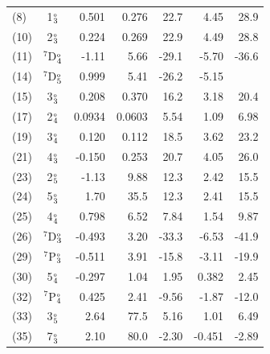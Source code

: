 \documentclass[10pt,a4paper, twoside, openright]{report}
\begin{document}
{\begin{longtable}{l@{\hspace{0.01cm}}c@{\hspace{0.5cm}}r@{\hspace{0.5cm}}r@{\hspace{0.5cm}}r@{\hspace{0.5cm}}r@{\hspace{0.5cm}}r}
(8)  & 1$_{3}^{\rm_o}$     & 0.501 &  0.276 & 22.7 & 4.45 & 28.9 \\
(10) & 2$_{3}^{\rm_o}$      & 0.224 & 0.269 & 22.9 & 4.49 & 28.8  \\
(11) & $^7$D$_{4}^{\rm_o}$    & -1.11 & 5.66 & -29.1 & -5.70 & -36.6   \\
(14) & $^7$D$_5^{\rm_o}$     & 0.999 &  5.41& -26.2 & -5.15  \\
(15) & 3$_{3}^{\rm_o}$     & 0.208 & 0.370 & 16.2 & 3.18 & 20.4   \\
(17) & 2$_{4}^{\rm_o}$      & 0.0934 & 0.0603 & 5.54 & 1.09 & 6.98   \\ 
(19) & 3$_{4}^{\rm_o}$      & 0.120 & 0.112 & 18.5 & 3.62 & 23.2   \\
(21) & 4$_{3}^{\rm_o}$      & -0.150 & 0.253 & 20.7 & 4.05 & 26.0  \\
(23) & 2$_{5}^{\rm_o}$      & -1.13 & 9.88 & 12.3 & 2.42 & 15.5   \\
 (24) & 5$_{3}^{\rm_o}$    & 1.70 & 35.5 & 12.3 & 2.41 & 15.5  \\
(25) & 4$_{4}^{\rm_o}$      & 0.798 & 6.52 & 7.84 & 1.54 & 9.87  \\ 
(26)  &  $^7$D$_{3}^{\rm_o}$   & -0.493 & 3.20 & -33.3 & -6.53 & -41.9  \\ 
(29) & $^7$P$_{3}^{\rm_o}$  & -0.511 & 3.91 & -15.8 & -3.11 & -19.9  \\ 
(30) &5$_{4}^{\rm_o}$     & -0.297 & 1.04 & 1.95 & 0.382 & 2.45  \\ 
(32) & $^7$P$_{4}^{\rm_o}$  & 0.425 &  2.41 & -9.56 & -1.87 & -12.0 \\ 
(33) &3$_{5}^{\rm_o}$     & 2.64 & 77.5 & 5.16 & 1.01 & 6.49   \\ 
(35) & 7$_{3}^{\rm_o}$    & 2.10 & 80.0 & -2.30 & -0.451 & -2.89  \\ 
\bottomrule
\bottomrule
\end{longtable}
}
\end{document}
